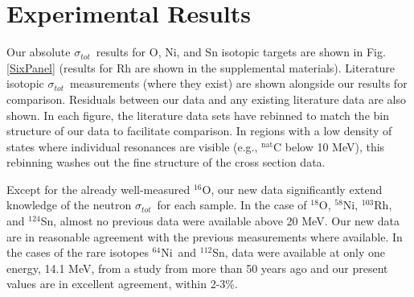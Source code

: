 \documentclass[twocolumn,secnumarabic,amssymb, nobibnotes, aps, prl,
superscriptaddress, nobalancelastpage]{revtex4}
\newcommand{\tot}{\ensuremath{\sigma_{tot}}}
\newcommand{\oSix}{\ensuremath{^{16}}O}
\newcommand{\oEight}{\ensuremath{^{18}}O}
\newcommand{\niEight}{\ensuremath{^{58}}N\lowercase{i}}
\newcommand{\niFour}{\ensuremath{^{64}}N\lowercase{i}}
\newcommand{\rhThree}{\ensuremath{^{103}}R\lowercase{h}}
\newcommand{\snTwelve}{\ensuremath{^{112}}S\lowercase{n}}
\newcommand{\snFour}{\ensuremath{^{124}}S\lowercase{n}}
\begin{document}
\section{Experimental Results}

Our absolute \tot\ results for O, Ni, and Sn isotopic targets are shown in Fig.
\ref{SixPanel} (results for Rh are shown in the supplemental materials).
Literature isotopic \tot\ measurements
(where they exist) are shown alongside our results for comparison.
Residuals between our data and any existing literature data are also shown.
In each figure, the literature data sets have rebinned to match the bin
structure of our data to facilitate comparison. In regions with a low density of
states where individual resonances are visible (e.g., $^{\text{nat}}$C
below 10 MeV), this rebinning washes out the fine structure of the
cross section data.

Except for the already well-measured \oSix, our new data significantly
extend knowledge of the neutron \tot\ for each sample. In the case of \oEight,
\niEight, \rhThree, and \snFour, almost no previous data were available
above 20 MeV. Our new data are in reasonable agreement with the previous
measurements where available. In the cases of the rare isotopes \niFour\ and \snTwelve,
data were available at only one energy, 14.1 MeV, from a study from more than 50
years ago \cite{Dukarevich1967} and our present values are in excellent agreement, within 2-3\%.
\end{document}
